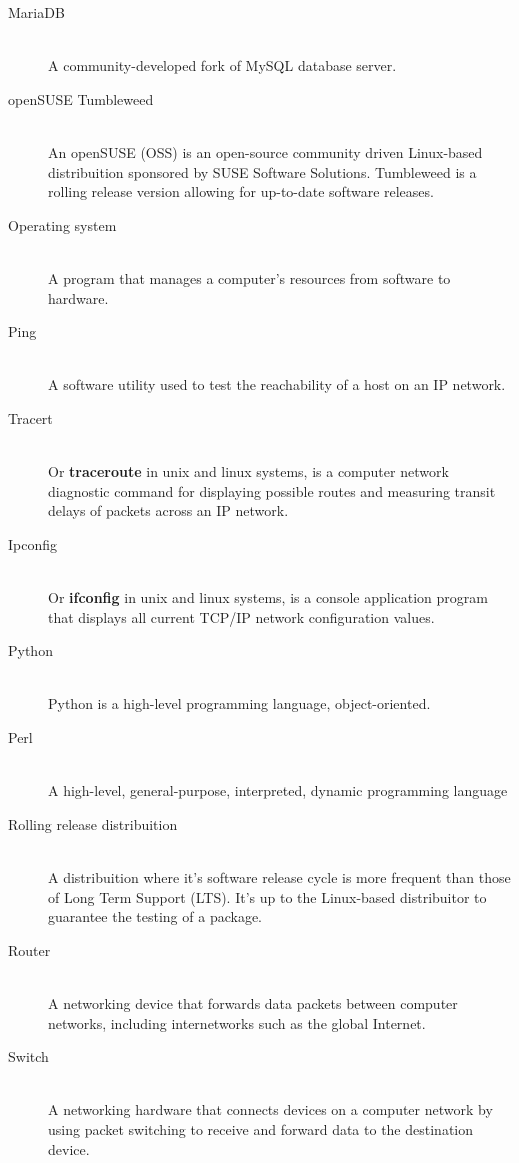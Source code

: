 \documentclass[11pt,a4paper]{report}
\begin{document}
\begin{description}
        \item[MariaDB] \hfill \\
            A community-developed fork of MySQL database server.
        \item[openSUSE Tumbleweed] \hfill \\
            An openSUSE (OSS) is an open-source community driven Linux-based distribuition sponsored by SUSE Software Solutions. Tumbleweed is a rolling release version allowing for up-to-date software releases.
        \item[Operating system] \hfill \\
            A program that manages a computer's resources from software to hardware.
        \item[Ping] \hfill \\
             A software utility used to test the reachability of a host on an IP network.
        \item[Tracert] \hfill \\
            Or \textbf{traceroute} in unix and linux systems, is a computer network diagnostic command for displaying possible routes and measuring transit delays of packets across an IP network.
        \item[Ipconfig] \hfill \\
            Or \textbf{ifconfig} in unix and linux systems, is a console application program that displays all current TCP/IP network configuration values.
        \item[Python] \hfill \\
            Python is a high-level programming language, object-oriented.
        \item[Perl] \hfill \\
            A high-level, general-purpose, interpreted, dynamic programming language
        \item[Rolling release distribuition] \hfill \\
            A distribuition where it's software release cycle is more frequent than those of Long Term Support (LTS). It's up to the Linux-based distribuitor to guarantee the testing of a package.
        \item[Router] \hfill \\
            A networking device that forwards data packets between computer networks, including internetworks such as the global Internet.
        \item[Switch] \hfill \\
            A networking hardware that connects devices on a computer network by using packet switching to receive and forward data to the destination device.

\end{description}
\end{document}
